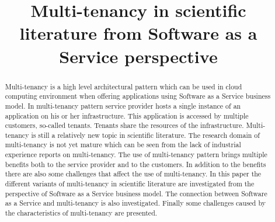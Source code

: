 \documentclass[conference]{sasmoota2017}
\begin{document}
%
\title{Multi-tenancy in scientific literature from Software as a Service perspective}


\author{
}


\maketitle

\begin{abstract}

Multi-tenancy is a high level architectural pattern which can be used in cloud computing environment when offering applications using Software as a Service business model. In multi-tenancy pattern service provider hosts a single instance of an application on his or her infrastructure. This application is accessed by multiple customers, so-called tenants. Tenants share the resources of the infrastructure. Multi-tenancy is still a relatively new topic in scientific literature. The research domain of multi-tenancy is not yet mature which can be seen from the lack of industrial experience reports on multi-tenancy. The use of multi-tenancy pattern brings multiple benefits both to the service provider and to the customers. In addition to the benefits there are also some challenges that affect the use of multi-tenancy. In this paper the different variants of multi-tenancy in scientific literature are investigated from the perspective of Software as a Service business model. The connection between Software as a Service and multi-tenancy is also investigated. Finally some challenges caused by the characteristics of multi-tenancy are presented. 

\end{abstract}
\end{document}
